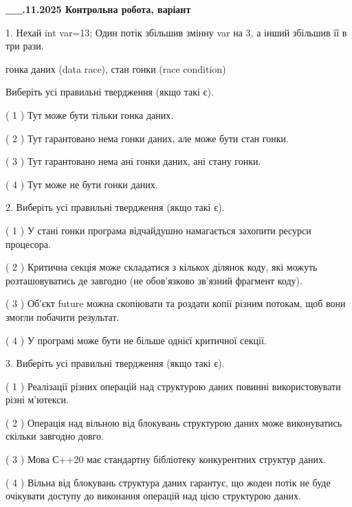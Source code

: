 \documentclass[12pt, ukrainian]{article}
\begin{document}
\newpage
\begin {large}

\textbf{\_\_.11.2025 Контрольна робота, варіант  }\par


{
1. Нехай int var=13; Один потік збільшив змінну var на 3, а інший збільшив її в три рази.

гонка даних (data race), стан гонки (race condition)

Виберіть усі правильні твердження (якщо такі є).\par
\vspace{2mm}
( 1 ) Тут може бути тільки гонка даних.%

( 2 ) Тут гарантовано нема гонки даних, але може бути стан гонки.%

( 3 ) Тут гарантовано нема ані гонки даних, ані стану гонки.%

( 4 ) Тут може не бути гонки даних.%


2. Виберіть усі правильні твердження (якщо такі є).\par
\vspace{2mm}

( 1 ) У стані гонки програма відчайдушно намагається захопити ресурси процесора.%

( 2 ) Критична секція може складатися з кількох ділянок коду, які можуть розташовуватись де завгодно (не обов’язково зв’язний фрагмент коду).%

( 3 ) Об’єкт future можна скопіювати та роздати копії різним потокам, щоб вони змогли побачити результат.%

( 4 ) У програмі може бути не більше однієї критичної секції.%


3. Виберіть усі правильні твердження (якщо такі є).\par
\vspace{2mm}

( 1 ) Реалізації різних операцій над структурою даних повинні використовувати різні м’ютекси.%

( 2 ) Операція над вільною від блокувань структурою даних може виконуватись скільки завгодно довго.%

( 3 ) Мова С++20 має стандартну бібліотеку конкурентних структур даних.%

( 4 ) Вільна від блокувань структура даних гарантує, що жоден потік не буде очікувати доступу до виконання операцій над цією структурою даних.%


}
\end{large}
\end{document}
